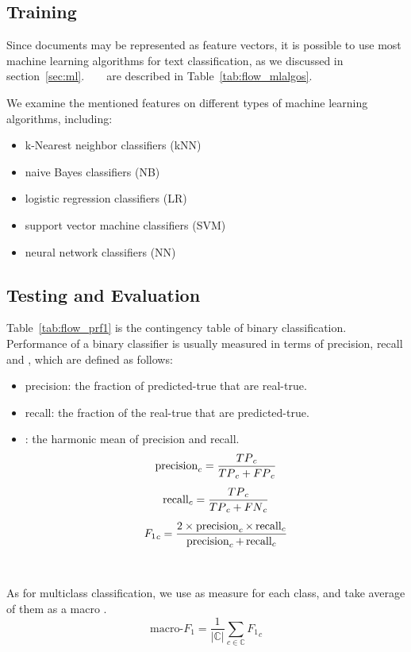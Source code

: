 \subsection{Training}
Since documents may be represented as feature vectors, it is possible to use most machine learning algorithms for text classification, as we discussed in section~\ref{sec:ml}.
~\newline
~\newline
{} are described in Table~\ref{tab:flow_mlalgos}.
\par We examine the mentioned features on different types of machine learning algorithms, including:
\begin{itemize}
\item k-Nearest neighbor classifiers (kNN)
\item naive Bayes classifiers (NB)
\item logistic regression classifiers (LR)
\item support vector machine classifiers (SVM)
\item neural network classifiers (NN)
\end{itemize}


\subsection{Testing and Evaluation}
Table~\ref{tab:flow_prf1} is the contingency table of binary classification. Performance of a binary classifier is usually measured in terms of precision, recall and \fscore{}\cite{sebastiani2002tc}, which are defined as follows:
\begin{itemize}
\item precision: the fraction of predicted-true that are real-true.
\item recall: the fraction of the real-true that are predicted-true.
\item \fscore{}: the harmonic mean of precision and recall.
\begin{equation*}
\begin{gathered}
	\precision_c = \dfrac{{TP}_c}{{TP}_c+{FP}_c}
\\[\eqlineskip]
	\recall_c = \dfrac{{TP}_c}{{TP}_c+{FN}_c}
\\[\eqlineskip]
	{F_1}_c = \dfrac{2 \times \precision_c \times \recall_c}{\precision_c + \recall_c}
\end{gathered}
\end{equation*}
\end{itemize}
\vspace{-\intextsep}

~\newline
{}
\par As for multiclass classification, we use \fscore{} as measure for each class, and take average of them as a macro \fscore{}.
\begin{equation*}
	\mathrm{macro}\text{-}F_1 = \dfrac{1}{|\mathbb{C}|} \sum_{c \in \mathbb{C}} {F_1}_c
\end{equation*}


